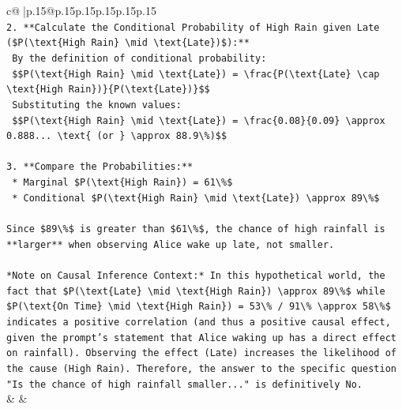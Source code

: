 \documentclass{article}
\begin{document}
{\begin{supertabular}{c@{$\;$}|p{.15\linewidth}@{}p{.15\linewidth}p{.15\linewidth}p{.15\linewidth}p{.15\linewidth}p{.15\linewidth}}
{{{\\ 
\texttt{2.  **Calculate the Conditional Probability of High Rain given Late (\$P(\textbackslash{}text\{High Rain\} \textbackslash{}mid \textbackslash{}text\{Late\})\$):**} \\
\texttt{    By the definition of conditional probability:} \\
\texttt{    \$\$P(\textbackslash{}text\{High Rain\} \textbackslash{}mid \textbackslash{}text\{Late\}) = \textbackslash{}frac\{P(\textbackslash{}text\{Late\} \textbackslash{}cap \textbackslash{}text\{High Rain\})\}\{P(\textbackslash{}text\{Late\})\}\$\$} \\
\texttt{    Substituting the known values:} \\
\texttt{    \$\$P(\textbackslash{}text\{High Rain\} \textbackslash{}mid \textbackslash{}text\{Late\}) = \textbackslash{}frac\{0.08\}\{0.09\} \textbackslash{}approx 0.888... \textbackslash{}text\{ (or \} \textbackslash{}approx 88.9\textbackslash{}\%)\$\$} \\
\\ 
\texttt{3.  **Compare the Probabilities:**} \\
\texttt{    *   Marginal \$P(\textbackslash{}text\{High Rain\}) = 61\textbackslash{}\%\$} \\
\texttt{    *   Conditional \$P(\textbackslash{}text\{High Rain\} \textbackslash{}mid \textbackslash{}text\{Late\}) \textbackslash{}approx 89\textbackslash{}\%\$} \\
\\ 
\texttt{Since \$89\textbackslash{}\%\$ is greater than \$61\textbackslash{}\%\$, the chance of high rainfall is **larger** when observing Alice wake up late, not smaller.} \\
\\ 
\texttt{*Note on Causal Inference Context:* In this hypothetical world, the fact that \$P(\textbackslash{}text\{Late\} \textbackslash{}mid \textbackslash{}text\{High Rain\}) \textbackslash{}approx 89\textbackslash{}\%\$ while \$P(\textbackslash{}text\{On Time\} \textbackslash{}mid \textbackslash{}text\{High Rain\}) = 53\textbackslash{}\% / 91\textbackslash{}\% \textbackslash{}approx 58\textbackslash{}\%\$ indicates a positive correlation (and thus a positive causal effect, given the prompt's statement that Alice waking up has a direct effect on rainfall). Observing the effect (Late) increases the likelihood of the cause (High Rain). Therefore, the answer to the specific question "Is the chance of high rainfall smaller..." is definitively No.} \\
            }
        }
    }
    & & \\ \\


\end{supertabular}}
\end{document}
